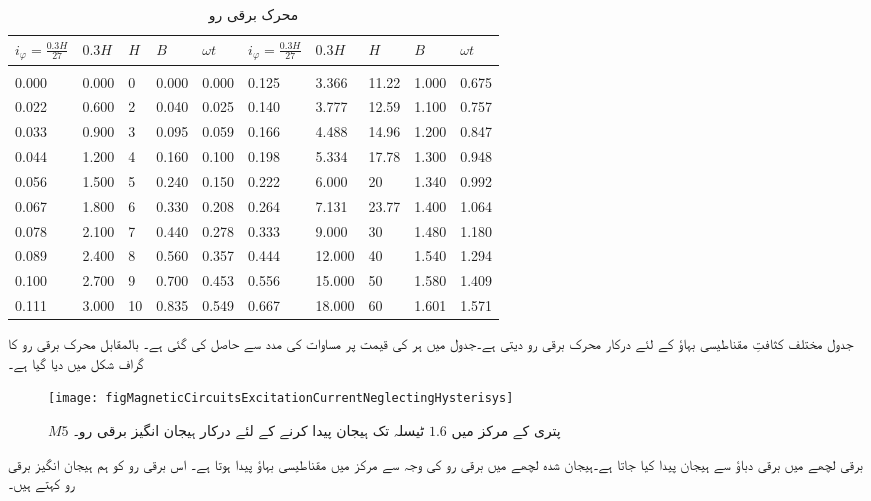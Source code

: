 %
\begin{table}
\begin{tabular}{l l l l l | l l l l l}
$i_{\varphi}=\frac{0.3 H}{27}$&$0.3H$&$H$&$B$&$\omega t$&$i_{\varphi}=\frac{0.3 H}{27}$&$0.3H$&$H$&$B$&$\omega t$\\
\hline\\
0.000&0.000&0&0.000&0.000&0.125&3.366&11.22&1.000&0.675\\
0.022&0.600&2&0.040&0.025&0.140&3.777&12.59&1.100&0.757\\
0.033&0.900&3&0.095&0.059&0.166&4.488&14.96&1.200&0.847\\
0.044&1.200&4&0.160&0.100&0.198&5.334&17.78&1.300&0.948\\
0.056&1.500&5&0.240&0.150&0.222&6.000&20&1.340&0.992\\
0.067&1.800&6&0.330&0.208&0.264&7.131&23.77&1.400&1.064\\
0.078&2.100&7&0.440&0.278&0.333&9.000&30&1.480&1.180\\
0.089&2.400&8&0.560&0.357&0.444&12.000&40&1.540&1.294\\
0.100&2.700&9&0.700&0.453&0.556&15.000&50&1.580&1.409\\
0.111&3.000&10&0.835&0.549&0.667&18.000&60&1.601&1.571\\
\hline
\end{tabular}
\caption{محرک برقی رو}
\label{جدول_مقناطیسی_ادوار_محرک_برقی_رو_بالمقابل_کثافت_بہاو}
\end{table}


جدول   مختلف کثافتِ مقناطیسی بہاؤ کے لئے درکار محرک برقی رو دیتی ہے۔جدول میں  ہر  کی قیمت پر   مساوات  کی مدد سے حاصل کی گئی ہے۔ بالمقابل محرک برقی رو کا گراف شکل  میں دیا گیا ہے۔
%
\begin{figure}
\centering
\texttt{[image: figMagneticCircuitsExcitationCurrentNeglectingHysterisys]}
\caption{$M5$ پتری کے مرکز میں $1.6$ ٹیسلہ تک ہیجان پیدا کرنے کے لئے درکار ہیجان انگیز برقی رو۔}
\label{شکل_مقناطیسی_ادوار_ہیجان_رو_چال_نظرانداز}
\end{figure}
برقی لچھے میں برقی دباؤ سے ہیجان پیدا کیا جاتا ہے۔ہیجان شدہ لچھے میں برقی رو کی وجہ سے  مرکز میں مقناطیسی بہاؤ پیدا ہوتا ہے۔ اس برقی رو  کو ہم ہیجان انگیز برقی رو  کہتے ہیں۔

